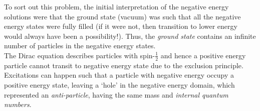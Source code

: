 \noindent
To sort out this problem, the initial interpretation of the negative energy solutions were that the ground state (vacuum) was such that all the negative energy states were fully filled (if it were not, then transition to lower energy would always have been a possibility!). Thus, the \textit{ground state} contains an infinite number of particles in the negative energy states. \\[0.2cm]
The Dirac equation describes particles with spin-$\frac{1}{2}$ and hence a positive energy particle cannot transit to negative energy state due to the exclusion principle.\\[0.2cm]
 Excitations can happen such that a particle with negative energy occupy a positive energy state, leaving a `hole' in the negative energy domain, which represented an \textit{anti-particle}, having the same mass and \textit{internal quantum numbers}.